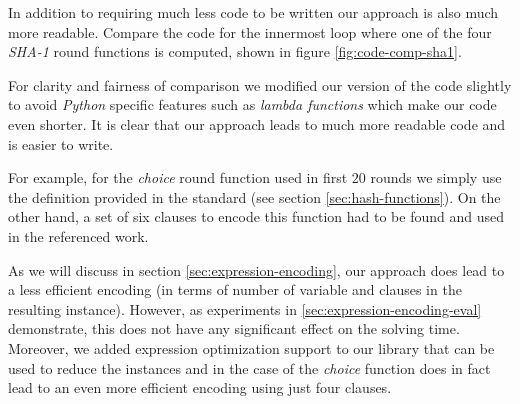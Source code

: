 In addition to requiring much less code to be written our approach is also much more readable.
Compare the code for the innermost loop where one of the four \emph{SHA-1} round functions is computed, shown in figure \ref{fig:code-comp-sha1}.

For clarity and fairness of comparison we modified our version of the code slightly to avoid \emph{Python} specific features such as \emph{lambda functions} which make our code even shorter.
It is clear that our approach leads to much more readable code and is easier to write.

For example, for the \emph{choice} round function used in first $20$ rounds we simply use the definition provided in the standard (see section \ref{sec:hash-functions}).
On the other hand, a set of six clauses to encode this function had to be found and used in the referenced work.

As we will discuss in section \ref{sec:expression-encoding}, our approach does lead to a less efficient encoding (in terms of number of variable and clauses in the resulting instance).
However, as experiments in \ref{sec:expression-encoding-eval} demonstrate, this does not have any significant effect on the solving time.
Moreover, we added expression optimization support to our library that can be used to reduce the instances and in the case of the \emph{choice} function does in fact lead to an even more efficient encoding using just four clauses.


